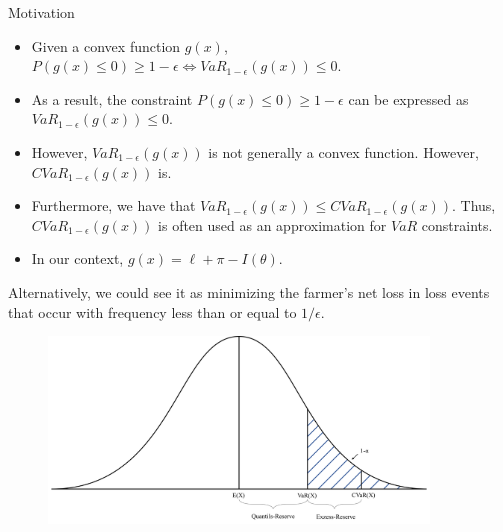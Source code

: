 \documentclass{beamer}
\begin{document}
\begin{frame}{Motivation}
    \begin{itemize}
        \item Given a convex function $g(x)$, $P(g(x) \leq 0 ) \geq 1-\epsilon \iff VaR_{1-\epsilon}(g(x)) \leq 0$. 
        \item As a result, the constraint $P(g(x) \leq 0) \geq 1-\epsilon$ can be expressed as $VaR_{1-\epsilon}(g(x)) \leq 0$.
        \item However, $VaR_{1-\epsilon}(g(x))$ is not generally a convex function. However, $CVaR_{1-\epsilon}(g(x))$ is. 
        \item Furthermore, we have that $VaR_{1-\epsilon}(g(x)) \leq CVaR_{1-\epsilon}(g(x))$. Thus, $CVaR_{1-\epsilon}(g(x))$ is often used as an approximation for $VaR$ constraints. 
        \item In our context, $g(x) = \ell + \pi -I(\theta)$.
    \end{itemize}
    
\end{frame}

\begin{frame}
    Alternatively, we could see it as minimizing the farmer's net loss in loss events that occur with frequency less than or equal to $1/\epsilon$.
    \begin{figure}
        \includegraphics[width=0.9\textwidth]{../../../output/CVaR.png}
    \end{figure}
\end{frame}
\end{document}
